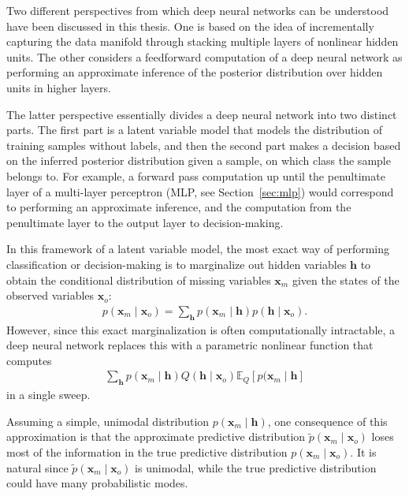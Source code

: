 \documentclass[dissertation,nocontribution,draft*]{aaltoseries}
\newcommand{\vect}[1]{\mathbf{#1}}
\newcommand{\vh}[0]{\vect{h}}
\newcommand{\vx}[0]{\vect{x}}
\newcommand{\E}[0]{\mathbb{E}}
\begin{document}
Two different perspectives from which deep neural networks
can be understood have been discussed in this thesis. One is
based on the idea of incrementally capturing the data manifold
through stacking multiple layers of nonlinear hidden units.
The other considers a feedforward computation of a deep
neural network as performing an approximate inference of the
posterior distribution over hidden units in higher layers.

The latter perspective essentially divides a deep neural
network into two distinct parts. The first part is a latent
variable model that models the distribution of training
samples without labels, and then the second part makes a
decision based on the inferred posterior distribution given
a sample, on which class the sample belongs to. For example,
a forward pass computation up until the penultimate layer of
a multi-layer perceptron (MLP, see Section~\ref{sec:mlp})
would correspond to performing an approximate inference, and the
computation from the penultimate layer to the output layer
to decision-making.

In this framework of a latent variable model, the most exact
way of performing classification or decision-making is
to marginalize out hidden variables $\vh$ to obtain the
conditional distribution of missing variables $\vx_m$ given
the states of the observed variables $\vx_o$:
\begin{align*}
    p(\vx_m \mid \vx_o) = \sum_{\vh} p(\vx_m \mid \vh) p(\vh
    \mid \vx_o).
\end{align*}
However, since this exact marginalization is often
computationally intractable, a deep neural network replaces
this with a parametric nonlinear function that computes
\begin{align*}
    \sum_{\vh} p(\vx_m \mid
    \vh) Q(\vh \mid \vx_o) 
    \E_Q\left[p(\vx_m \mid
    \vh \right]
\end{align*}
in a single sweep.

Assuming a simple, unimodal distribution $p(\vx_m \mid
\vh)$, one consequence of this approximation is that the
approximate predictive distribution $\tilde{p}(\vx_m \mid
\vx_o)$ loses most of the information in the true predictive
distribution $p(\vx_m \mid \vx_o)$. It is natural since
$\tilde{p}(\vx_m \mid \vx_o)$ is unimodal, while the true
predictive distribution could have many probabilistic modes.
\end{document}
